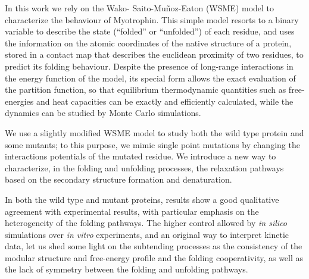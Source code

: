 In this work we rely on the Wako- Saito-Mu\~noz-Eaton (WSME) model to characterize the behaviour of
Myotrophin.
This simple model resorts to a binary variable to describe the state (``folded'' or ``unfolded'') of each
residue, and uses the information on the atomic coordinates of the native %
structure of a protein, stored in a contact map that describes the euclidean proximity of two residues,   to predict its folding behaviour. %
Despite the presence of long-range  interactions  in the energy function of the model, its special form allows the exact evaluation of the partition function, so that equilibrium thermodynamic quantities such as free-energies and heat capacities can be exactly and efficiently calculated, while the dynamics can be studied by Monte Carlo simulations.

We use a slightly modified WSME model to study both the wild type protein and
some mutants; to this purpose, we mimic  single point mutations by changing the
interactions potentials of the mutated residue.
We introduce a new way to characterize, in the folding and unfolding processes,
the relaxation pathways based on the secondary structure formation and denaturation.

 

In both the wild type and mutant proteins, results show a good qualitative agreement with experimental results, with
particular emphasis on the heterogeneity of the folding pathways.
The higher control allowed by  \emph{in silico} simulations over \emph{in vitro}
experiments, and an original way to interpret kinetic data,
 let us shed some light on the subtending processes as the
consistency of the modular structure and free-energy profile and the folding
cooperativity, as well as the lack of  symmetry between the folding and
unfolding pathways.




